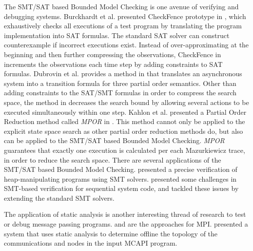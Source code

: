 The SMT/SAT based Bounded Model Checking is one avenue of verifying and debugging systems. Burckhardt et al. presented CheckFence prototype in \cite{burckhardt:pldi07}, which exhaustively checks all executions of a test program by translating the program implementation into SAT formulas. The standard SAT solver can construct counterexample if incorrect executions exist. Instead of over-approximating at the beginning and then further compressing the observations, CheckFence in \cite{burckhardt:pldi07} increments the observations each time step by adding constraints to SAT formulas. Dubrovin et al. provides a method in \cite{heljanko:scp} that translates an asynchronous system into a transition formula for three partial order semantics. Other than adding constraints to the SAT/SMT formulas in order to compress the search space, the method in \cite{heljanko:scp} decreases the search bound by allowing several actions to be executed simultaneously within one step. Kahlon et al. presented a Partial Order Reduction method called \textit{MPOR} in \cite{kahlon:cav09}. This method cannot only be applied to the explicit state space search as other partial order reduction methods do, but also can be applied to the SMT/SAT based Bounded Model Checking. \textit{MPOR} guarantees that exactly one execution is calculated per each Mazurkiewicz trace, in order to reduce the search space. There are several applications of the SMT/SAT based Bounded Model Checking. \cite{lahiri:popl08} presented a precise verification of heap-manipulating programs using SMT solvers. \cite{lahiri:cav11} presented some challenges in SMT-based verification for sequential system code, and tackled these issues by extending the standard SMT solvers.

The application of static analysis is another interesting thread of research to test or debug message passing programs. \cite{zhang:ppopp07} and \cite{greg:cgo09} are the approaches for MPI. \cite{gray:lctes11} presented a system that uses static analysis to determine offline the topology of the communications and nodes in the input MCAPI program.
